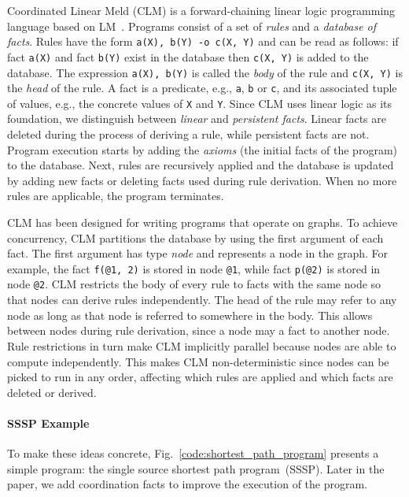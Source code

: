 Coordinated Linear Meld (CLM) is a forward-chaining linear logic programming
language based on LM~\cite{cruz-iclp14}.
Programs consist of a set of \emph{rules} and a \emph{database of facts}.
Rules have the form \texttt{a(X), b(Y) -o c(X, Y)} and can be read as follows: if fact \texttt{a(X)}
and fact \texttt{b(Y)} exist in the database then \texttt{c(X, Y)} is added to
the database. The expression \texttt{a(X), b(Y)} is called the \emph{body} of
the rule and \texttt{c(X, Y)} is the \emph{head} of the rule.
A fact is a predicate, e.g., \texttt{a}, \texttt{b} or \texttt{c}, and its
associated tuple of values, e.g., the concrete values of \texttt{X} and
\texttt{Y}. Since CLM uses linear logic as its foundation, we distinguish between
\emph{linear} and \emph{persistent facts}. Linear facts are deleted during the
process of deriving a rule, while persistent facts are not.
Program execution starts by adding the \emph{axioms} (the initial facts of the
program) to the database. Next, rules are recursively applied and the
database is updated by adding new facts or deleting facts used during rule derivation.
When no more rules are applicable, the program terminates.

CLM has been designed for writing programs that operate on graphs. To achieve
concurrency, CLM partitions the database by using the first argument of each fact. The first argument has
type \emph{node} and represents a node in the graph. For example,
the fact \texttt{f(@1, 2)} is stored in node \texttt{@1}, while
fact \texttt{p(@2)} is stored in node \texttt{@2}. CLM restricts the body of
every rule to facts with the same node so that nodes can derive rules
independently. The head of the rule may refer
to any node as long as that node is referred to somewhere in the body. This allows
 between nodes during rule derivation, since a node may
 a fact to another node.  Rule restrictions in turn make CLM
implicitly parallel because nodes are able to compute independently. This makes
CLM non-deterministic since nodes can be picked to run in any order, affecting
which rules are applied and which facts are deleted or derived.

\paragraph{SSSP Example}\label{sect:ssspex}
To make these ideas concrete, Fig.~\ref{code:shortest_path_program} presents
a simple program: the single source shortest path program~(SSSP). Later in the paper, we
add coordination facts to improve the execution of the program.

